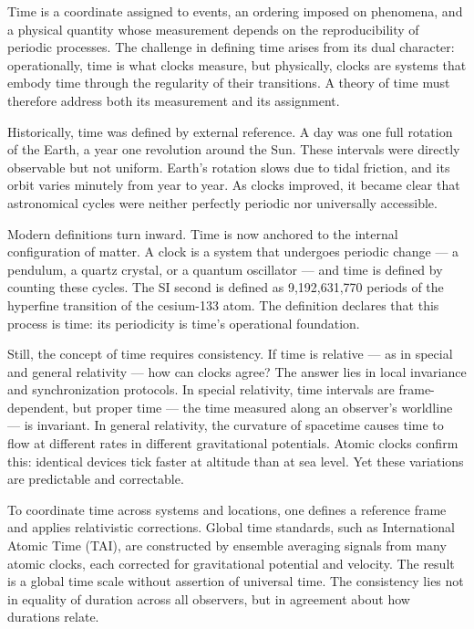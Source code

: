 Time is a coordinate assigned to events, an ordering imposed on phenomena, and a physical quantity whose measurement depends on the reproducibility of periodic processes. The challenge in defining time arises from its dual character: operationally, time is what clocks measure, but physically, clocks are systems that embody time through the regularity of their transitions. A theory of time must therefore address both its measurement and its assignment.

Historically, time was defined by external reference. A day was one full rotation of the Earth, a year one revolution around the Sun. These intervals were directly observable but not uniform. Earth's rotation slows due to tidal friction, and its orbit varies minutely from year to year. As clocks improved, it became clear that astronomical cycles were neither perfectly periodic nor universally accessible.

Modern definitions turn inward. Time is now anchored to the internal configuration of matter. A clock is a system that undergoes periodic change — a pendulum, a quartz crystal, or a quantum oscillator — and time is defined by counting these cycles. The SI second is defined as 9,192,631,770 periods of the hyperfine transition of the cesium-133 atom. The definition declares that this process is time: its periodicity is time's operational foundation.

Still, the concept of time requires consistency. If time is relative — as in special and general relativity — how can clocks agree? The answer lies in local invariance and synchronization protocols. In special relativity, time intervals are frame-dependent, but proper time — the time measured along an observer’s worldline — is invariant. In general relativity, the curvature of spacetime causes time to flow at different rates in different gravitational potentials. Atomic clocks confirm this: identical devices tick faster at altitude than at sea level. Yet these variations are predictable and correctable.

To coordinate time across systems and locations, one defines a reference frame and applies relativistic corrections. Global time standards, such as International Atomic Time (TAI), are constructed by ensemble averaging signals from many atomic clocks, each corrected for gravitational potential and velocity. The result is a global time scale without assertion of universal time. The consistency lies not in equality of duration across all observers, but in agreement about how durations relate.

